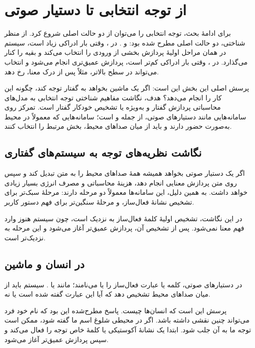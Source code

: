 \section{از توجه انتخابی تا دستیار صوتی}
برای ادامهٔ بحث، توجه انتخابی را می‌توان از دو حالت اصلی شروع کرد. از منظر شناختی، دو حالت اصلی مطرح شده بود:  و . در ، وقتی بار ادراکی زیاد است، سیستم در همان مراحل اولیهٔ پردازش بخشی از ورودی را انتخاب می‌کند و بقیه را کنار می‌گذارد. در ، وقتی بار ادراکی کم‌تر است، پردازش عمیق‌تری انجام می‌شود و انتخاب می‌تواند در سطح بالاتر، مثلاً پس از درک معنا، رخ دهد.

پرسش اصلی این بخش این است: اگر یک ماشین بخواهد به گفتار توجه کند، چگونه این کار را انجام می‌دهد؟ هدف، نگاشت مفاهیم شناختی توجه انتخابی به مدل‌های محاسباتی پردازش گفتار و به‌ویژه  یا تشخیص خودکار گفتار است. تمرکز روی سامانه‌هایی مانند دستیارهای صوتی، از جمله  و  است؛ سامانه‌هایی که معمولاً در محیط به‌صورت  حضور دارند و باید از میان صداهای محیط، بخش مرتبط را انتخاب کنند.

\subsection{نگاشت نظریه‌های توجه به سیستم‌های گفتاری}
اگر یک دستیار صوتی بخواهد همیشه همهٔ صداهای محیط را به متن تبدیل کند و سپس روی متن پردازش معنایی انجام دهد، هزینهٔ محاسباتی و مصرف انرژی بسیار زیادی خواهد داشت. به همین دلیل، این سامانه‌ها معمولاً دو مرحله دارند: مرحلهٔ سبک‌تر برای تشخیص نشانهٔ فعال‌ساز، و مرحلهٔ سنگین‌تر برای فهم دستور کاربر.

در این نگاشت، تشخیص اولیهٔ کلمهٔ فعال‌ساز به  نزدیک است، چون سیستم هنوز وارد فهم معنا نمی‌شود. پس از تشخیص آن، پردازش عمیق‌تر آغاز می‌شود و این مرحله به  نزدیک‌تر است.

\subsection{ در انسان و ماشین}
در دستیارهای صوتی، کلمه یا عبارت فعال‌ساز را  یا  می‌نامند؛ مانند  یا . سیستم باید از میان صداهای محیط تشخیص دهد که آیا این عبارت گفته شده است یا نه.

پرسش این است که  انسان‌ها چیست. پاسخ مطرح‌شده این بود که نام خود فرد می‌تواند چنین نقشی داشته باشد. اگر در محیطی شلوغ اسم ما گفته شود، ممکن است توجه ما به آن جلب شود. ابتدا یک نشانهٔ آکوستیکی یا کلمهٔ خاص توجه را فعال می‌کند و سپس پردازش عمیق‌تر آغاز می‌شود.

